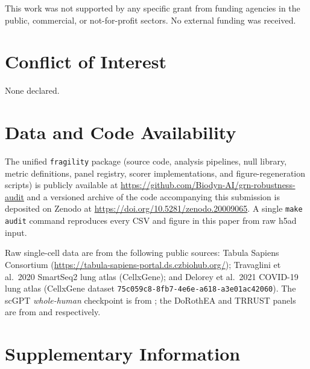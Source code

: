 \documentclass[unnumsec,webpdf,contemporary,large,namedate]{oup-authoring-template}
\begin{document}
This work was not supported by any specific grant from funding agencies in the
public, commercial, or not-for-profit sectors. No external funding was received.

\section*{Conflict of Interest}

None declared.

\section*{Data and Code Availability}

The unified \texttt{fragility} package (source code, analysis
pipelines, null library, metric definitions, panel registry, scorer
implementations, and figure-regeneration scripts) is publicly available
at \url{https://github.com/Biodyn-AI/grn-robustness-audit} and a
versioned archive of the code accompanying this submission is deposited
on Zenodo at \url{https://doi.org/10.5281/zenodo.20009065}. A single
\texttt{make audit} command reproduces every CSV and figure in this
paper from raw h5ad input.

Raw single-cell data are from the following public sources: Tabula
Sapiens Consortium (\url{https://tabula-sapiens-portal.ds.czbiohub.org/});
Travaglini et al.\ 2020 SmartSeq2 lung atlas (CellxGene); and
Delorey et al.\ 2021 COVID-19 lung atlas (CellxGene dataset
\texttt{75c059c8-8fb7-4e6e-a618-a3e01ac42060}).
The scGPT \emph{whole-human} checkpoint is from
\citet{Cui2024}; the DoRothEA and TRRUST panels are from
\citet{GarciaAlonso2019} and \citet{Han2018} respectively.

\section*{Supplementary Information}
\end{document}
